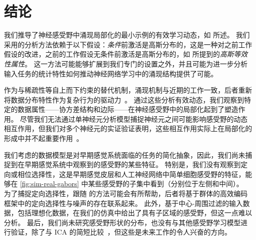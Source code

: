\section{结论}
\label{sec:conclusions}

我们推导了神经感受野中涌现局部化的最小示例的有效学习动态，如 \textcite{ingrosso2022data} 所述。
我们采用的分析方法依赖于以下假设：\emph{条件}前激活是高斯分布的，这是一种对之前工作假设的改进，之前的工作假设无条件前激活是高斯分布的，如 \textcite{ingrosso2022data} 所提到的\emph{高斯等效性属性}。
这一方法可能能够扩展到我们专门的设置之外，并且可能为进一步分析输入任务的统计特性如何推动神经网络学习中的涌现结构提供了可能。

作为与稀疏性等自上而下约束的替代机制，涌现机制与近期的工作一致，后者重新将数据分布特性作为复杂行为的驱动力~\parencite{chan2022data}。
通过这些分析有效动态，我们观察到特定的数据属性——协方差结构和边际——在神经感受野中的局部化起到了塑造作用。
尽管我们无法通过单神经元分析模型捕捉神经元之间可能影响感受野的动态相互作用，但我们对多个神经元的实证验证表明，这些相互作用实际上在局部化的形成中并不起重要作用~\cite[\cf][]{harsh2020placecell}。

我们考虑的数据模型是对早期感觉系统面临的任务的简化抽象，因此，我们尚未捕捉到在早期感觉系统中观察到的感受野的某些特征。
特别是，我们没有观察到定向或相位选择性，这是早期感觉皮层和人工神经网络中简单细胞感受野的特征，能够在 \cref{fig:sim-real-gabors} 中某些感受野的子集中看到（分别位于左侧和中间）。
为了捕捉定向选择性，跟随 \textcite{karklin2011efficient} 的方法可能会有所帮助，后者将基于群体的高效编码框架中的定向选择性与噪声的存在联系起来。
此外，基于中心-周围过滤的输入数据，包括理想化数据，在我们的仿真中给出了具有子区域的感受野，但这一点难以分析。
最后，我们尚未研究感受野形状的分布，也没有与其他感受野学习模型进行验证，除了与 ICA 的简短比较~\parencite[\cf][]{saxe2011unsupervised}，但这些是未来工作的令人兴奋的方向。
